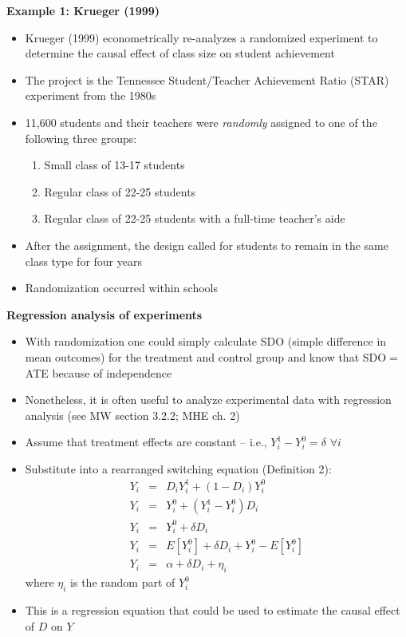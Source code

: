 \documentclass{beamer}
\begin{document}
\begin{frame}[plain]
	\begin{center}
	\textbf{Example 1: Krueger (1999)}
	\end{center}
	
	\begin{itemize}
	\item Krueger (1999) econometrically re-analyzes a randomized experiment to determine the causal effect of class size on student achievement
	\item The project is the Tennessee Student/Teacher Achievement Ratio (STAR) experiment from the 1980s
	\item 11,600 students and their teachers were \emph{randomly} assigned to one of the following three groups:
		\begin{enumerate}
		\item Small class of 13-17 students
		\item Regular class of 22-25 students
		\item Regular class of 22-25 students with a full-time teacher's aide
		\end{enumerate}
	\item After the assignment, the design called for students to remain in the same class type for four years
	\item Randomization occurred within schools
	\end{itemize}
\end{frame}

\begin{frame}[plain,shrink=20]
	\begin{center}
	\textbf{Regression analysis of experiments}
	\end{center}
	
	\begin{itemize}
	\item With randomization one could simply calculate SDO (simple difference in mean outcomes) for the treatment and control group and know that SDO$=$ATE because of independence
	\item Nonetheless, it is often useful to analyze experimental data with regression analysis (see MW section 3.2.2; MHE ch. 2)
	\item Assume that treatment effects are constant -- i.e., $Y^1_i - Y^0_i=\delta$  $\forall i$
	\item Substitute into a rearranged switching equation (Definition 2):
		\begin{eqnarray*}
		Y_i &=& D_iY_i^1 + (1-D_i)Y^0_i \\
		Y_i &=& Y^0_i + (Y^1_i-Y^0_i)D_i \\
		Y_i &=& Y^0_i + \delta D_i  \\
		Y_i &=&E[Y^0_i] + \delta D_i+ Y_i^0 - E[Y_i^0] \\
		Y_i &=& \alpha + \delta D_i + \eta_i
		\end{eqnarray*}where $\eta_i$ is the random part of $Y_i^0$
	\item This is a regression equation that could be used to estimate the causal effect of $D$ on $Y$
	\end{itemize}
\end{frame}
\end{document}
